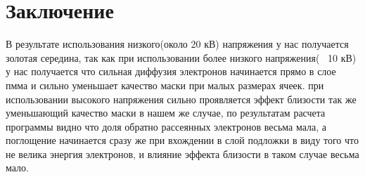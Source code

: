 \chapter*{Заключение}
В результате использования низкого(около 20 кВ) напряжения у нас получается золотая середина,
так как при использовании более низкого напряжения(~ 10 кВ) у нас получается что сильная диффузия электронов начинается прямо в слое пмма и сильно уменьшает качество маски при малых размерах ячеек.
при использовании высокого напряжения сильно проявляется эффект близости так же уменьшающий качество маски
в нашем же случае, по результатам расчета программы видно что доля обратно рассеянных электронов весьма мала, а поглощение начинается сразу же при вхождении в слой подложки в виду того что не велика энергия электронов, и влияние эффекта близости в таком случае весьма мало.
